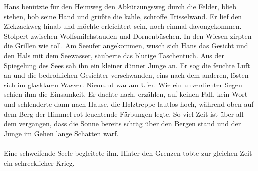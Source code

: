Hans benützte für den Heimweg den Abkürzungsweg durch die Felder, blieb stehen, hob seine Hand und grüßte die kahle, schroffe Trisselwand. Er lief den Zickzackweg hinab und möchte erleichtert sein, noch einmal davongekommen. Stolpert zwischen Wolfsmilchstauden und Dornenbüschen. In den Wiesen zirpten die Grillen wie toll. Am Seeufer angekommen, wusch sich Hans das Gesicht und den Hals mit dem Seewasser, säuberte das blutige Taschentuch. Aus der Spiegelung des Sees sah ihn ein kleiner dünner Junge an. Er sog die feuchte Luft an und die bedrohlichen Gesichter verschwanden, eins nach dem anderen, lösten sich im glasklaren Wasser. Niemand war am Ufer. Wie ein unverdienter Segen schien ihm die Einsamkeit. Er dachte nach, erzählen, auf keinen Fall, kein Wort und schlenderte dann nach Hause, die Holztreppe lautlos hoch, während oben auf dem Berg der Himmel rot leuchtende Färbungen legte. So viel Zeit ist über all dem vergangen, dass die Sonne bereits schräg über den Bergen stand und der Junge im Gehen lange Schatten warf. \\\\
Eine schweifende Seele begleitete ihn. Hinter den Grenzen tobte zur gleichen Zeit ein schrecklicher Krieg. 





